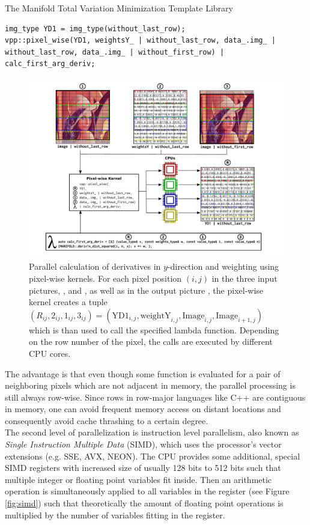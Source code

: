 \begin{chapter}{The Manifold Total Variation Minimization Template Library}
\begin{lstlisting}[label=code:pixelwise_demo,caption={Pixel-wise forward derivative computation}]
img_type YD1 = img_type(without_last_row);
vpp::pixel_wise(YD1, weightsY_ | without_last_row, data_.img_ | without_last_row, data_.img_ | without_first_row) | calc_first_arg_deriv;
\end{lstlisting}

\begin{figure}[h!]
        \centering
	    \includegraphics[width=1.0\linewidth]{./figures/library/pixelwise_kernel.pdf}
	\caption[Calculation using pixel-wise kernels]{Parallel calculation of derivatives in $y$-direction and weighting using pixel-wise kernels.
	    For each pixel position $(i,j)$ in the three input pictures, ,  and , as well as in the output picture
	    , the pixel-wise kernel creates a tuple $(R_{ij}, 2_{ij}, 1_{ij}, 3_{ij})=(\text{YD1}_{i,j},\text{weightY}_{i,j},\text{Image}_{i,j},\text{Image}_{i+1,j})$
	    which is than used to call the specified lambda function. Depending on the row number of the pixel, the calls are executed by different CPU cores.
	}
	\label{fig:pixelwise_kernel}
\end{figure}

The advantage is that even though some function is evaluated for a pair of neighboring pixels which are not adjacent in memory, the parallel processing is still
always row-wise. Since rows in row-major languages like C++ are contiguous in memory, one can avoid frequent memory access on distant locations and consequently avoid cache thrashing to a certain degree.\\

The second level of parallelization is instruction level parallelism, also known as \textit{Single Instruction Multiple Data} (SIMD), which uses the
processor's vector extensions (e.g. SSE, AVX, NEON).
The CPU provides some additional, special SIMD registers with increased size of usually 128 bits to 512 bits such that multiple integer or floating point variables fit inside.
Then an arithmetic operation is simultaneously applied to all variables in the register (see Figure \ref{fig:simd}) such that theoretically the amount of floating point operations is multiplied by the number
of variables fitting in the register. \\


\end{chapter}
